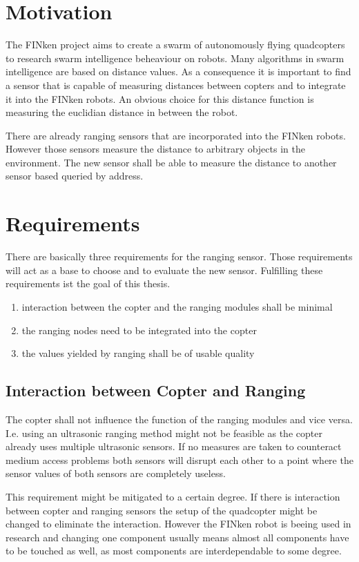 \section{Motivation}

The FINken project aims to create a swarm of autonomously flying quadcopters to research swarm intelligence beheaviour on robots.
Many algorithms in swarm intelligence are based on distance values. 
As a consequence it is important to find a sensor that is capable of measuring distances between copters and to integrate it into the FINken robots.
An obvious choice for this distance function is measuring the euclidian distance in between the robot.

There are already ranging sensors that are incorporated into the FINken robots.
However those sensors measure the distance to arbitrary objects in the environment.
The new sensor shall be able to measure the distance to another sensor based queried by address.

\section{Requirements}
\label{req}
There are basically three requirements for the ranging sensor.
Those requirements will act as a base to choose and to evaluate the new sensor.
Fulfilling these requirements ist the goal of this thesis.

\begin{enumerate}
	\item interaction between the copter and the ranging modules shall be minimal
	\item the ranging nodes need to be integrated into the copter
	\item the values yielded by ranging shall be of usable quality
\end{enumerate}

\subsection{Interaction between Copter and Ranging}
\label{req1}
The copter shall not influence the function of the ranging modules and vice versa.
I.e. using an ultrasonic ranging method might not be feasible as the copter already uses multiple ultrasonic sensors.
If no measures are taken to counteract medium access problems both sensors will disrupt each other to a point where the sensor values of both sensors are completely useless.

This requirement might be mitigated to a certain degree.
If there is interaction between copter and ranging sensors the setup of the quadcopter might be changed to eliminate the interaction.
However the FINken robot is beeing used in research and changing one component usually means almost all components have to be touched as well, as most components are interdependable to some degree.


